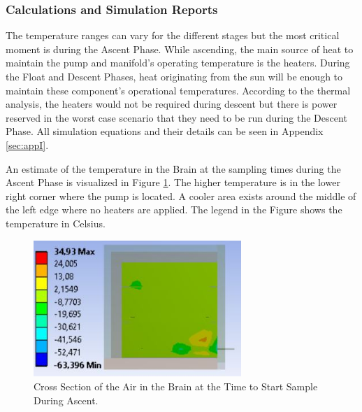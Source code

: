 \documentclass[a4paper,12pt,oneside]{article} %
\begin{document}
\subsubsection{Calculations and Simulation Reports}
\label{sec:4.6.5}

The temperature ranges can vary for the different stages but the most critical moment is during the Ascent Phase. While ascending, the main source of heat to maintain the pump and manifold's operating temperature is the heaters. During the Float and Descent Phases, heat originating from the sun will be enough to maintain these component's operational temperatures. According to the thermal analysis, the heaters would not be required during descent but there is power reserved in the worst case scenario that they need to be run during the Descent Phase.
All simulation equations and their details can be seen in Appendix \ref{sec:appI}. 

An estimate of the temperature in the Brain at the sampling times during the Ascent Phase is visualized in Figure \ref{fig:Air-in-brain-4-6}. The higher temperature is in the lower right corner where the pump is located. A cooler area exists around the middle of the left edge where no heaters are applied. The legend in the Figure shows the temperature in Celsius.

\begin{figure}[H]
    \centering
    \includegraphics[width=0.7\textwidth]{4-experiment-design/img/Thermal/air-sampling-with-box}
    \caption{Cross Section of the Air in the Brain at the Time to Start Sample During Ascent.}
    \label{fig:Air-in-brain-4-6}
\end{figure}
\end{document}
